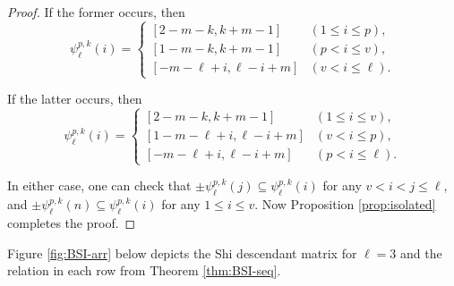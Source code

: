 \documentclass[11pt]{article}
\theoremstyle{definition}
\numberwithin{equation}{section}
\begin{document}
\begin{proof}
If the former occurs, then 
$$
 \psi_{\ell}^{p,k}(i)  =\begin{cases}
[2 - m -k, k+m-1 ] & (1 \leq   i \leq p), \\
[ 1 - m -k, k+m-1] & (p<  i \leq  v), \\
[ - m - \ell+i , \ell-i+m ] & (v <  i \leq  \ell ).
\end{cases}
$$
 
If the latter occurs, then
$$
 \psi_{\ell}^{p,k}(i) =\begin{cases}
[2 - m -k, k+m-1] & (1 \leq   i \leq  v), \\
[ 1- m - \ell+i , \ell-i+m]  & ( v<  i \leq p), \\
[ - m - \ell+i , \ell-i+m] & (p<  i \leq  \ell ).
\end{cases}
$$

In either case, one can check that $\pm  \psi_{\ell}^{p,k}(j) \subseteq \psi_{\ell}^{p,k}(i) $ for any $v< i<j \le \ell$, and $\pm  \psi_{\ell}^{p,k}(n) \subseteq \psi_{\ell}^{p,k}(i) $ for any $ 1 \le i  \le v$. 
Now Proposition \ref{prop:isolated} completes the proof.
\end{proof}

Figure \ref{fig:BSI-arr} below depicts the Shi descendant  matrix for $\ell=3$ and the relation in each row from Theorem \ref{thm:BSI-seq}.
 
\end{document}
